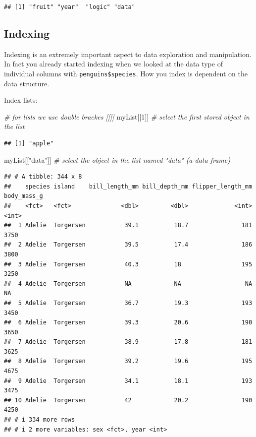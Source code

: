 \documentclass[
]{book}
\newenvironment{Shaded}{\begin{snugshade}}{\end{snugshade}}
\newcommand{\CommentTok}[1]{\textcolor[rgb]{0.56,0.35,0.01}{\textit{#1}}}
\newcommand{\DecValTok}[1]{\textcolor[rgb]{0.00,0.00,0.81}{#1}}
\newcommand{\NormalTok}[1]{#1}
\newcommand{\StringTok}[1]{\textcolor[rgb]{0.31,0.60,0.02}{#1}}
\begin{document}
\begin{verbatim}
## [1] "fruit" "year"  "logic" "data"
\end{verbatim}

\hypertarget{indexing}{%
\subsection{Indexing}\label{indexing}}

Indexing is an extremely important aspect to data exploration and manipulation. In fact you already started indexing when we looked at the data type of individual columns with \texttt{penguins\$species}. How you index is dependent on the data structure.

Index lists:

\begin{Shaded}
\begin{Highlighting}[]
\CommentTok{\# for lists we use double brackes [[]]}
\NormalTok{myList[[}\DecValTok{1}\NormalTok{]] }\CommentTok{\# select the first stored object in the list}
\end{Highlighting}
\end{Shaded}

\begin{verbatim}
## [1] "apple"
\end{verbatim}

\begin{Shaded}
\begin{Highlighting}[]
\NormalTok{myList[[}\StringTok{"data"}\NormalTok{]] }\CommentTok{\# select the object in the list named "data" (a data frame)}
\end{Highlighting}
\end{Shaded}

\begin{verbatim}
## # A tibble: 344 x 8
##    species island    bill_length_mm bill_depth_mm flipper_length_mm body_mass_g
##    <fct>   <fct>              <dbl>         <dbl>             <int>       <int>
##  1 Adelie  Torgersen           39.1          18.7               181        3750
##  2 Adelie  Torgersen           39.5          17.4               186        3800
##  3 Adelie  Torgersen           40.3          18                 195        3250
##  4 Adelie  Torgersen           NA            NA                  NA          NA
##  5 Adelie  Torgersen           36.7          19.3               193        3450
##  6 Adelie  Torgersen           39.3          20.6               190        3650
##  7 Adelie  Torgersen           38.9          17.8               181        3625
##  8 Adelie  Torgersen           39.2          19.6               195        4675
##  9 Adelie  Torgersen           34.1          18.1               193        3475
## 10 Adelie  Torgersen           42            20.2               190        4250
## # i 334 more rows
## # i 2 more variables: sex <fct>, year <int>
\end{verbatim}
\end{document}
